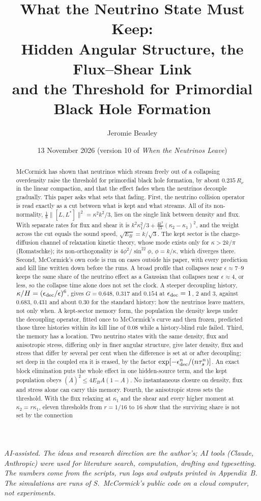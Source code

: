 \documentclass[11pt]{article}
\title{What the Neutrino State Must Keep:\\ Hidden Angular Structure, the Flux--Shear Link\\ and the Threshold for Primordial Black Hole Formation}
\author{Jeromie Beasley}
\date{13 November 2026 \quad (version 10 of \emph{When the Neutrinos Leave})}
\begin{document}
\maketitle

\noindent\emph{AI-assisted. The ideas and research direction are the author's; AI tools (Claude, Anthropic) were used for literature search, computation, drafting and typesetting. The numbers come from the scripts, run logs and outputs printed in Appendix~B. The simulations are runs of S.~McCormick's public code on a cloud computer, not experiments.}

\begin{abstract}
McCormick has shown that neutrinos which stream freely out of a collapsing overdensity raise the threshold for primordial black hole formation, by about $0.235\,R_\nu$ in the linear compaction, and that the effect fades when the neutrinos decouple gradually. This paper asks what sets that fading. First, the neutrino collision operator is read exactly as a cut between what is kept and what streams. All of its non-normality, $\tfrac18\lVert[L,L^\ast]\rVert^2=\kappa^2k^2/3$, lies on the single link between density and flux. With separate rates for flux and shear it is $k^2\kappa_1^2/3+\tfrac{4k^2}{15}(\kappa_2-\kappa_1)^2$, and the weight across the cut equals the sound speed, $\sqrt{E_B}=k/\sqrt3$. The kept sector is the charge-diffusion channel of relaxation kinetic theory, whose mode exists only for $\kappa>2k/\pi$ (Romatschke); its non-orthogonality is $4\phi^2/\sin^22\phi$, $\phi=k/\kappa$, which diverges there. Second, McCormick's own code is run on cases outside his paper, with every prediction and kill line written down before the runs. A broad profile that collapses near $\epsilon\approx7$--$9$ keeps the same share of the neutrino effect as a Gaussian that collapses near $\epsilon\approx4$, or less, so the collapse time alone does not set the clock. A steeper decoupling history, $\kappa/H=(\epsilon_{\rm dec}/\epsilon)^6$, gives $G=0.648$, $0.317$ and $0.154$ at $\epsilon_{\rm dec}=1$, $2$ and $3$, against $0.683$, $0.431$ and about $0.30$ for the standard history: how the neutrinos leave matters, not only when. A kept-sector memory form, the population the density keeps under the decoupling operator, fitted once to McCormick's curve and then frozen, predicted those three histories within its kill line of $0.08$ while a history-blind rule failed. Third, the memory has a location. Two neutrino states with the same density, flux and anisotropic stress, differing only in finer angular structure, give later density, flux and stress that differ by several per cent when the difference is set at or after decoupling; set deep in the coupled era it is erased, by the factor $\exp[-\epsilon_{\rm dec}^n/(n\tau_s^n)]$. An exact block elimination puts the whole effect in one hidden-source term, and the kept population obeys $(\dot A)^2\le4E_BA(1-A)$. No instantaneous closure on density, flux and stress alone can carry this memory. Fourth, the anisotropic stress sets the threshold. With the flux relaxing at $\kappa_1$ and the shear and every higher moment at $\kappa_2=r\kappa_1$, eleven thresholds from $r=1/16$ to $16$ show that the surviving share is not set by the connection 
\end{abstract}
\end{document}
